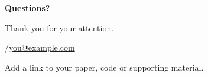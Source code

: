 \begin{frame}[plain]
\vfill
{\Huge\bfseries Questions?}\par\vspace{5mm}
{\large\color{accent}Thank you for your attention.}\par
{}\vspace{5mm}
\insertauthor\quad /\quad\href{mailto:you@example.com}{you@example.com}\par
{\small\color{muted}Add a link to your paper, code or supporting material.}
\vfill
\end{frame}
